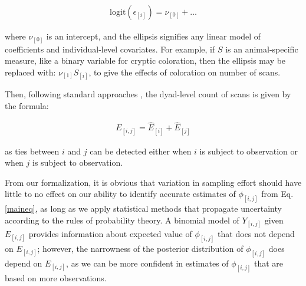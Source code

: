 \documentclass[Afour,sageh,times]{sagej}
\begin{document}
\begin{ceqn}
\begin{align}\label{eq2b}
\text{logit}(\epsilon_{[i]}) = \nu_{[0]} + \ldots 
\end{align}
\end{ceqn}
where $\nu_{[0]}$ is an intercept, and the ellipsis signifies any linear model of coefficients and individual-level covariates. For example, if $S$ is an animal-specific measure, like a binary variable for cryptic coloration, then the ellipsis  may be replaced with:  $\nu_{[1]}S_{[i]}$, to give the effects of coloration on number of scans. 

Then, following standard approaches \citep[e.g.,][]{Farine2015a}, the dyad-level count of scans is given by the formula:
\begin{ceqn}
\begin{align}\label{eq2c}
E_{[i,j]} = \hat E_{[i]} + \hat E_{[j]} 
\end{align}
\end{ceqn}
as ties between $i$ and $j$ can be detected either when $i$ is subject to observation or when $j$ is subject to observation.

From our formalization, it is obvious that variation in sampling effort should have little to no effect on our ability to identify accurate estimates of $\phi_{[i,j]}$ from Eq. \ref{maineq}, as long as we apply statistical methods that propagate uncertainty according to the rules of probability theory. A binomial model of $Y_{[i,j]}$ given $E_{[i,j]}$ provides information about expected value of $\phi_{[i,j]}$ that does not depend on $E_{[i,j]}$; however, the narrowness of the posterior distribution of $\phi_{[i,j]}$ does depend on $E_{[i,j]}$, as we can be more confident in estimates of $\phi_{[i,j]}$ that are based on more observations.
\end{document}
